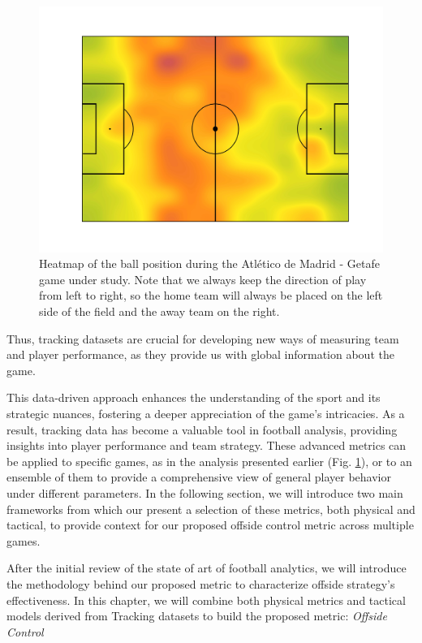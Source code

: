 \documentclass[
  twoside,nohyper]{book}
\begin{document}
\begin{figure}[H]

{\centering \includegraphics[width=0.8\linewidth,]{imagenes/Heatmap} 

}

\caption{Heatmap of the ball position during the Atlético de Madrid - Getafe game under study. Note that we always keep the direction of play from left to right, so the home team will always be placed on the left side of the field and the away team on the right.}\label{fig:heatmap}
\end{figure}

Thus, tracking datasets are crucial for developing new ways of measuring team and player performance, as they provide us with global information about the game.

This data-driven approach enhances the understanding of the sport and its strategic nuances, fostering a deeper appreciation of the game's intricacies. As a result, tracking data has become a valuable tool in football analysis, providing insights into player performance and team strategy. These advanced metrics can be applied to specific games, as in the analysis presented earlier (Fig. \ref{fig:heatmap}), or to an ensemble of them to provide a comprehensive view of general player behavior under different parameters. In the following section, we will introduce two main frameworks from which our present a selection of these metrics, both physical and tactical, to provide context for our proposed offside control metric across multiple games.

After the initial review of the state of art of football analytics, we will introduce the methodology behind our proposed metric to characterize offside strategy's effectiveness. In this chapter, we will combine both physical metrics and tactical models derived from Tracking datasets to build the proposed metric: \emph{Offside Control}
\end{document}
